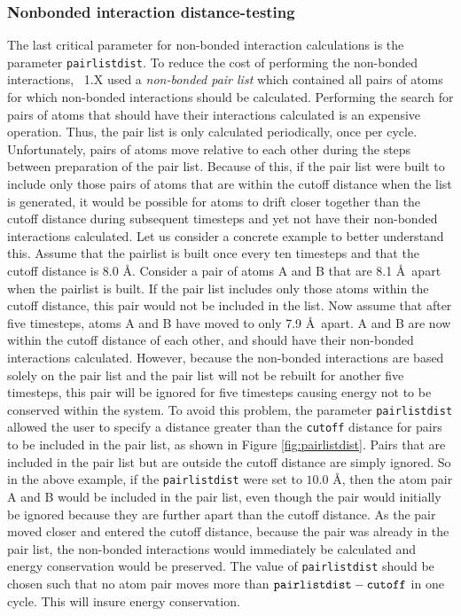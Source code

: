\subsubsection{Nonbonded interaction distance-testing}
The last critical parameter for non-bonded
interaction calculations is the parameter {\tt pairlistdist}.  To reduce the
cost of performing the non-bonded interactions, \NAMD\ 1.X used a {\it non-bonded
pair list} which contained all pairs of atoms for which
non-bonded interactions
should be calculated.  Performing the search for pairs of atoms that
should have their interactions calculated is an expensive operation.  Thus,
the pair list is only calculated periodically, once per cycle.   Unfortunately,
pairs of atoms move relative to each other during the steps between preparation
of the pair list.  Because of this, if the pair list were built to include
only
those pairs of atoms that are within the cutoff distance
when the list is generated, it would
be possible 
for atoms to drift closer together
than the cutoff distance during subsequent timesteps and yet not
have their non-bonded interactions calculated.  
\prettypar
Let us consider a concrete example to better understand this.  Assume that the
pairlist is built once every ten timesteps and that the cutoff
distance is 8.0 \AA.  Consider a pair
of atoms A and B that are 8.1 \AA\ apart when the pairlist is built.
If the pair list
includes only those atoms within the cutoff distance, this pair would not
be included in the list.  Now assume that after five timesteps, atoms
A and B have moved to only 7.9 \AA\ apart.  A and B are now within the
cutoff distance of each other, and should have their
non-bonded interactions calculated.
However, because the non-bonded interactions are based solely on the pair list
and the pair list will not be rebuilt for another five timesteps, this pair
will be ignored for five timesteps causing energy not to be conserved 
within the system.  
\prettypar
To avoid this problem, the parameter {\tt pairlistdist} allowed the user
to specify a distance greater than the {\tt cutoff} distance for pairs
to be included in the pair list, as shown in Figure \ref{fig:pairlistdist}.
Pairs that are included in the pair list but are outside the cutoff distance
are simply ignored.  So in the above example, if the {\tt pairlistdist}
were set to $10.0$ \AA, then 
the atom pair A and B would be included in the pair list, even though
the pair would initially be ignored because they are further apart than
the cutoff distance.  As the pair moved closer and entered the cutoff
distance, because the pair was already in the pair list, the non-bonded
interactions would immediately be calculated and energy conservation
would be preserved.  The value of {\tt pairlistdist} should be chosen
such that no atom pair moves more than 
$\mbox{{\tt pairlistdist}}-\mbox{{\tt cutoff}}$ 
in one cycle.  This will insure energy conservation.

